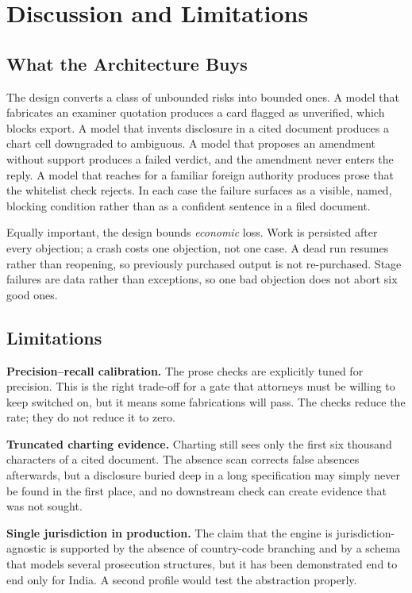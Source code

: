 \documentclass[conference]{IEEEtran}
\begin{document}
\section{Discussion and Limitations}

\subsection{What the Architecture Buys}

The design converts a class of unbounded risks into bounded ones. A model that fabricates an examiner quotation produces a card flagged as unverified, which blocks export. A model that invents disclosure in a cited document produces a chart cell downgraded to ambiguous. A model that proposes an amendment without support produces a failed verdict, and the amendment never enters the reply. A model that reaches for a familiar foreign authority produces prose that the whitelist check rejects. In each case the failure surfaces as a visible, named, blocking condition rather than as a confident sentence in a filed document.

Equally important, the design bounds \emph{economic} loss. Work is persisted after every objection; a crash costs one objection, not one case. A dead run resumes rather than reopening, so previously purchased output is not re-purchased. Stage failures are data rather than exceptions, so one bad objection does not abort six good ones.

\subsection{Limitations}

\textbf{Precision--recall calibration.} The prose checks are explicitly tuned for precision. This is the right trade-off for a gate that attorneys must be willing to keep switched on, but it means some fabrications will pass. The checks reduce the rate; they do not reduce it to zero.

\textbf{Truncated charting evidence.} Charting still sees only the first six thousand characters of a cited document. The absence scan corrects false absences afterwards, but a disclosure buried deep in a long specification may simply never be found in the first place, and no downstream check can create evidence that was not sought.

\textbf{Single jurisdiction in production.} The claim that the engine is jurisdiction-agnostic is supported by the absence of country-code branching and by a schema that models several prosecution structures, but it has been demonstrated end to end only for India. A second profile would test the abstraction properly.
\end{document}

